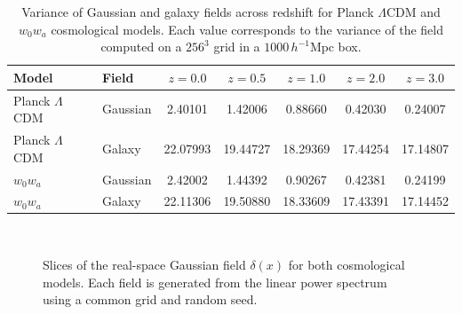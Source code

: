 \documentclass[trackchanges]{aastex7}
\begin{document}
\begin{table}[ht]
    \centering
    \caption{Variance of Gaussian and galaxy fields across redshift for Planck \(\Lambda\)CDM and \( w_0w_a \) cosmological models. Each value corresponds to the variance of the field computed on a \( 256^3 \) grid in a \( 1000 \, h^{-1}\mathrm{Mpc} \) box.}
    \label{tab:field_variance}
    \begin{tabular}{llccccc}
    \hline
    \textbf{Model} & \textbf{Field} & \( z = 0.0 \) & \( z = 0.5 \) & \( z = 1.0 \) & \( z = 2.0 \) & \( z = 3.0 \) \\
    \hline
    Planck \(\Lambda\)CDM & Gaussian & 2.40101 & 1.42006 & 0.88660 & 0.42030 & 0.24007 \\
    Planck \(\Lambda\)CDM & Galaxy   & 22.07993 & 19.44727 & 18.29369 & 17.44254 & 17.14807 \\
    \( w_0w_a \)          & Gaussian & 2.42002 & 1.44392 & 0.90267 & 0.42381 & 0.24199 \\
    \( w_0w_a \)          & Galaxy   & 22.11306 & 19.50880 & 18.33609 & 17.43391 & 17.14452 \\
    \hline
    \end{tabular}
\end{table}

\begin{figure}[ht]
    \centering
    \\[0.5em]
    \caption{Slices of the real-space Gaussian field \(\delta(x)\) for both cosmological models. Each field is generated from the linear power spectrum using a common grid and random seed.}
    \label{fig:gaussian_slices_stacked}
\end{figure}
\end{document}
